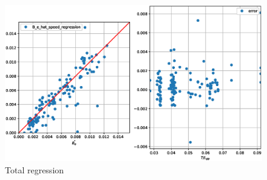 \begin{figure}[H]
    \centering
    \includegraphics[width=\columnwidth]{figures/B_e_factor_regression_total.eps}
    \caption{Total regression}
    \label{fig:B_e_factor_regression_total}
\end{figure}
